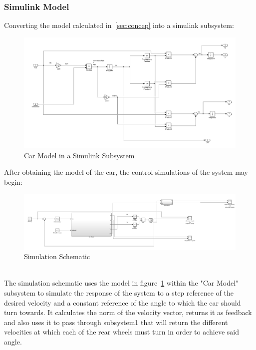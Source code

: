 \subsubsection{Simulink Model}
Converting the model calculated in~\ref{sec:concep} into a simulink subsystem:
\begin{figure}[!htbp]
\centering
       \includegraphics[page=1,width=1\textwidth]{img/subsystem.png} 
\caption{Car Model in a Simulink Subsystem}
\label{img:carModel}
\end{figure}
After obtaining the model of the car, the control simulations of the system may begin:
\begin{figure}[!htbp]
\centering
       \includegraphics[page=1,width=1\textwidth]{img/system.png} 
\caption{Simulation Schematic}
\end{figure}\\
The simulation schematic uses the model in figure~\ref{img:carModel} within the "Car Model" subsystem to simulate the response of the system to a step reference of the desired velocity and a constant reference of the angle to which the car should turn towards. It calculates the norm of the velocity vector, returns it as feedback and also uses it to pass through subsystem1 that will return the different velocities at which each of the rear wheels must turn in order to achieve said angle.